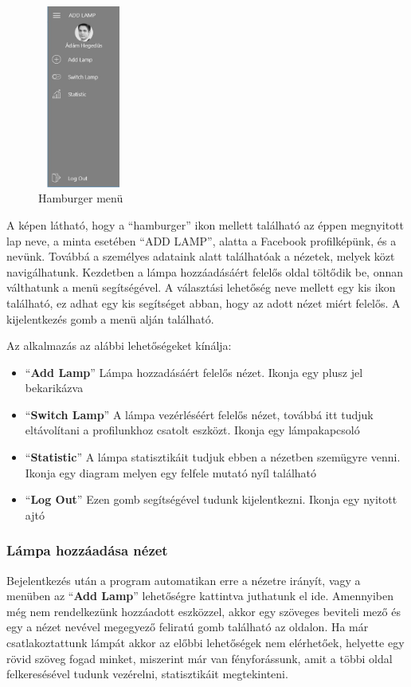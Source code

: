 \documentclass[a4paper,12pt]{report}
\begin{document}
    \begin{figure}[H]
        \centering
        \includegraphics[width=3cm,height=6cm,keepaspectratio]{images/hamburgermenu.jpg}
        \caption{Hamburger menü}
        \label{fig: Hamburger}
    \end{figure}

    A képen látható, hogy a ``hamburger'' ikon mellett található az éppen megnyitott lap neve, a minta esetében ``ADD LAMP'',
    alatta a Facebook profilképünk, és a nevünk.
    Továbbá a személyes adataink alatt találhatóak a nézetek, melyek közt navigálhatunk. Kezdetben a lámpa hozzáadásáért felelős
    oldal töltődik be, onnan válthatunk a menü segítségével. A választási lehetőség neve mellett egy kis ikon található, ez
    adhat egy kis segítséget abban, hogy az adott nézet miért felelős. A kijelentkezés gomb a menü alján található.

    Az alkalmazás az alábbi lehetőségeket kínálja:

    \begin{itemize}
        \item ``\textbf{Add Lamp}'' Lámpa hozzadásáért felelős nézet. Ikonja egy plusz jel bekarikázva
        \item ``\textbf{Switch Lamp}'' A lámpa vezérléséért felelős nézet, továbbá itt tudjuk eltávolítani a profilunkhoz csatolt
        eszközt. Ikonja egy lámpakapcsoló
        \item ``\textbf{Statistic}'' A lámpa statisztikáit tudjuk ebben a nézetben szemügyre venni. Ikonja egy diagram melyen egy felfele
        mutató nyíl található
        \item  ``\textbf{Log Out}'' Ezen gomb segítségével tudunk kijelentkezni. Ikonja egy nyitott ajtó
    \end{itemize}

    \subsubsection{Lámpa hozzáadása nézet}
    Bejelentkezés után a program automatikan erre a nézetre irányít, vagy a menüben az ``\textbf{Add Lamp}'' lehetőségre
    kattintva juthatunk el ide.
    Amennyiben még nem rendelkezünk hozzáadott eszközzel, akkor egy szöveges beviteli mező és egy a nézet nevével megegyező
    feliratú gomb található az oldalon. Ha már csatlakoztattunk lámpát akkor az előbbi lehetőségek nem elérhetőek, helyette
    egy rövid szöveg fogad minket, miszerint már van fényforássunk, amit a többi oldal felkeresésével tudunk vezérelni, statisztikáit
    megtekinteni.
\end{document}
